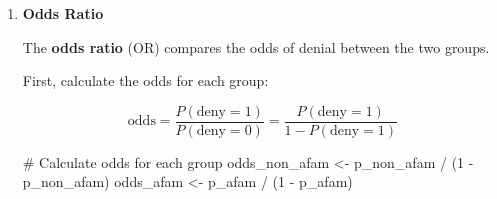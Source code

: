 \documentclass[
  12pt,
  letterpaper,
]{scrbook}
\newenvironment{Shaded}{\begin{snugshade}}{\end{snugshade}}
\newcommand{\CommentTok}[1]{\textcolor[rgb]{0.37,0.37,0.37}{#1}}
\newcommand{\DecValTok}[1]{\textcolor[rgb]{0.68,0.00,0.00}{#1}}
\newcommand{\FunctionTok}[1]{\textcolor[rgb]{0.28,0.35,0.67}{#1}}
\newcommand{\NormalTok}[1]{\textcolor[rgb]{0.00,0.23,0.31}{#1}}
\newcommand{\OtherTok}[1]{\textcolor[rgb]{0.00,0.23,0.31}{#1}}
\newcommand{\SpecialCharTok}[1]{\textcolor[rgb]{0.37,0.37,0.37}{#1}}
\newcommand{\StringTok}[1]{\textcolor[rgb]{0.13,0.47,0.30}{#1}}
\providecommand{\tightlist}{%
  \setlength{\itemsep}{0pt}\setlength{\parskip}{0pt}}
\renewcommand{\tightlist}{\setlength{\itemsep}{0.5\baselineskip}\setlength{\parskip}{0.2\baselineskip}}
\theoremstyle{definition}
\theoremstyle{plain}
\theoremstyle{remark}
\begin{document}
\begin{enumerate}
  The \textbf{risk ratio} or \textbf{relative risk} (RR) is the ratio of
  denial rates:

  \[
  RR = \frac{P(\text{deny}=1|\text{afam}=1)}{P(\text{deny}=1|\text{afam}=0)}
  \]

\begin{Shaded}
\begin{Highlighting}[]
\NormalTok{RR }\OtherTok{\textless{}{-}}\NormalTok{ p\_afam }\SpecialCharTok{/}\NormalTok{ p\_non\_afam}
\FunctionTok{cat}\NormalTok{(}\StringTok{"}\SpecialCharTok{\textbackslash{}n}\StringTok{Risk Ratio (Relative Risk):}\SpecialCharTok{\textbackslash{}n}\StringTok{"}\NormalTok{)}
\FunctionTok{cat}\NormalTok{(}\StringTok{"===========================}\SpecialCharTok{\textbackslash{}n}\StringTok{"}\NormalTok{)}
\FunctionTok{cat}\NormalTok{(}\FunctionTok{sprintf}\NormalTok{(}\StringTok{"RR = \%.4f / \%.4f = \%.4f}\SpecialCharTok{\textbackslash{}n}\StringTok{"}\NormalTok{, p\_afam, p\_non\_afam, RR))}
\end{Highlighting}
\end{Shaded}

\begin{verbatim}

Risk Ratio (Relative Risk):
===========================
RR = 0.2832 / 0.0926 = 3.0581
\end{verbatim}

  \textbf{Interpretation:} African American applicants have a denial
  rate that is 3.06 times higher than non-African American applicants.

  \begin{itemize}
  \tightlist
  \item
    If \(RR = 1\): no difference in risk
  \item
    If \(RR > 1\): higher risk for the treatment group (African
    Americans, \texttt{afam=1})
  \item
    If \(RR < 1\): lower risk for the treatment group
  \end{itemize}
\item
  \textbf{Odds Ratio}

  The \textbf{odds ratio} (OR) compares the odds of denial between the
  two groups.

  First, calculate the odds for each group:

  \[
  \text{odds} = \frac{P(\text{deny}=1)}{P(\text{deny}=0)} = \frac{P(\text{deny}=1)}{1 - P(\text{deny}=1)}
  \]

\begin{Shaded}
\begin{Highlighting}[]
\CommentTok{\# Calculate odds for each group}
\NormalTok{odds\_non\_afam }\OtherTok{\textless{}{-}}\NormalTok{ p\_non\_afam }\SpecialCharTok{/}\NormalTok{ (}\DecValTok{1} \SpecialCharTok{{-}}\NormalTok{ p\_non\_afam)}
\NormalTok{odds\_afam }\OtherTok{\textless{}{-}}\NormalTok{ p\_afam }\SpecialCharTok{/}\NormalTok{ (}\DecValTok{1} \SpecialCharTok{{-}}\NormalTok{ p\_afam)}


\end{Highlighting}
\end{Shaded}
\end{enumerate}
\end{document}
